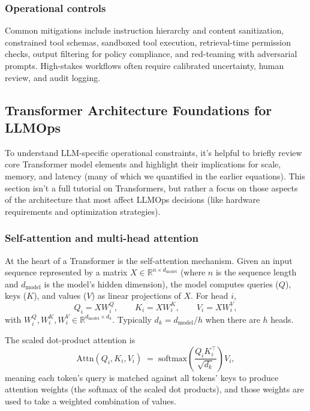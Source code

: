 \subsubsection{Operational controls}
Common mitigations include instruction hierarchy and content sanitization, constrained tool schemas,
sandboxed tool execution, retrieval-time permission checks, output filtering for policy compliance,
and red-teaming with adversarial prompts. High-stakes workflows often require calibrated uncertainty,
human review, and audit logging.

\subsection{Transformer Architecture Foundations for LLMOps}
To understand LLM-specific operational constraints, it’s helpful to briefly review core Transformer model elements and highlight their implications for scale, memory, and latency (many of which we quantified in the earlier equations). This section isn’t a full tutorial on Transformers, but rather a focus on those aspects of the architecture that most affect LLMOps decisions (like hardware requirements and optimization strategies).

\subsubsection{Self-attention and multi-head attention}
At the heart of a Transformer is the self-attention mechanism. Given an input
sequence represented by a matrix $X \in \mathbb{R}^{n \times d_{\text{model}}}$
(where $n$ is the sequence length and $d_{\text{model}}$ is the model's hidden
dimension), the model computes queries ($Q$), keys ($K$), and values ($V$) as
linear projections of $X$. For head $i$,
\begin{equation}
  Q_i = X W_i^{Q}, \qquad
  K_i = X W_i^{K}, \qquad
  V_i = X W_i^{V},
\end{equation}
with $W_i^{Q}, W_i^{K}, W_i^{V} \in \mathbb{R}^{d_{\text{model}}\times d_k}$.
Typically $d_k = d_{\text{model}}/h$ when there are $h$ heads.

The scaled dot-product attention is
\begin{equation}
  \mathrm{Attn}(Q_i,K_i,V_i)
  \;=\;
  \mathrm{softmax}\!\left(\frac{Q_i K_i^{\top}}{\sqrt{d_k}}\right) V_i,
\end{equation}
meaning each token's query is matched against all tokens' keys to produce
attention weights (the softmax of the scaled dot products), and those weights
are used to take a weighted combination of values.

